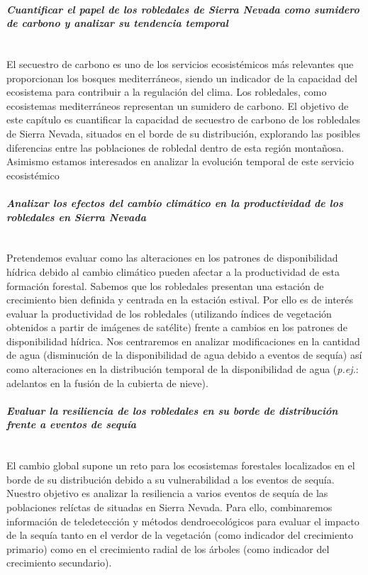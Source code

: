 \paragraph{\emph{Cuantificar el papel de los robledales de Sierra Nevada como sumidero de carbono y analizar su tendencia temporal}} \mbox{} \\
El secuestro de carbono es uno de los servicios ecosistémicos más relevantes que proporcionan los bosques mediterráneos, siendo un indicador de la capacidad del ecosistema para contribuir a la regulación del clima. Los robledales, como ecosistemas mediterráneos representan un sumidero de carbono. El objetivo de este capítulo es cuantificar la capacidad  de secuestro de carbono de los robledales de Sierra Nevada, situados en el borde de su distribución, explorando las posibles diferencias entre las poblaciones de robledal dentro de esta región montañosa. Asimismo estamos interesados en analizar la evolución temporal de este servicio ecosistémico 

\paragraph{\emph{Analizar los efectos del cambio climático en la productividad de los robledales en Sierra Nevada}} \mbox{} \\
Pretendemos evaluar como las alteraciones en los patrones de disponibilidad hídrica debido al cambio climático pueden afectar a la productividad de esta formación forestal. Sabemos que los robledales presentan una estación de crecimiento bien definida y centrada en la estación estival. Por ello es de interés evaluar la productividad de los robledales (utilizando índices de vegetación obtenidos a partir de imágenes de satélite) frente a cambios en los patrones de disponibilidad hídrica. Nos centraremos en analizar modificaciones en la cantidad de agua (disminución de la disponibilidad de agua debido a eventos de sequía) así como alteraciones en la distribución temporal de la disponibilidad de agua (\emph{p.ej.}: adelantos en la fusión de la cubierta de nieve).

\paragraph{\emph{Evaluar la resiliencia de los robledales en su borde de distribución frente a eventos de sequía}}\mbox{} \\
El cambio global supone un reto para los ecosistemas forestales localizados en el borde de su distribución debido a su vulnerabilidad a los eventos de sequía. Nuestro objetivo es analizar la resiliencia a varios eventos de sequía de las poblaciones relíctas de \Qp situadas en Sierra Nevada. Para ello, combinaremos información de teledetección y métodos dendroecológicos para evaluar el impacto de la sequía tanto en el verdor de la vegetación (como indicador del crecimiento primario) como en el crecimiento radial de los árboles (como indicador del crecimiento secundario).

